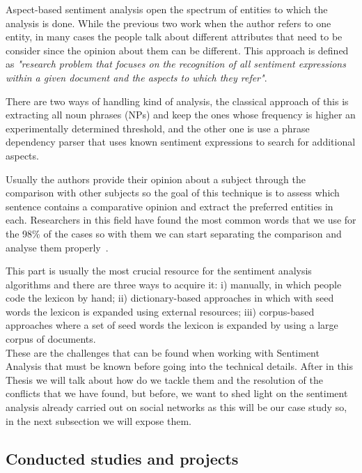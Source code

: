 Aspect-based sentiment analysis open the spectrum of entities to which the analysis is done. While the previous two work when the author refers to one entity, in many cases the people talk about different attributes that need to be consider since the opinion about them can be different. This approach is defined as \textit{"research problem that focuses on the recognition of all sentiment expressions within a given document and the aspects to which they refer"}.

There are two ways of handling kind of analysis, the classical approach of this is extracting all noun phrases (NPs) and keep the ones whose frequency is higher an experimentally determined threshold, and the other one is use a phrase dependency parser that uses known sentiment expressions to search for additional aspects.

Usually the authors provide their opinion about a subject through the comparison with other subjects so the goal of this technique is to assess which sentence contains a comparative opinion and extract the preferred entities in each. Researchers in this field have found the most common words that we use for the 98\% of the cases so with them we can start separating the comparison and analyse them properly~\cite{jindal2006identifying}.

This part is usually the most crucial resource for the sentiment analysis algorithms and there are three ways to acquire it: i) manually, in which people code the lexicon by hand; ii) dictionary-based approaches in which with seed words the lexicon is expanded using external resources; iii) corpus-based approaches where a set of seed words the lexicon is expanded by using a large corpus of documents.\\

These are the challenges that can be found when working with Sentiment Analysis that must be known before going into the technical details. After in this Thesis we will talk about how do we tackle them and the resolution of the conflicts that we have found, but before, we want to shed light on the sentiment analysis already carried out on social networks as this will be our case study so, in the next subsection we will expose them.


\subsection{Conducted studies and projects}
\label{sec:studies}

